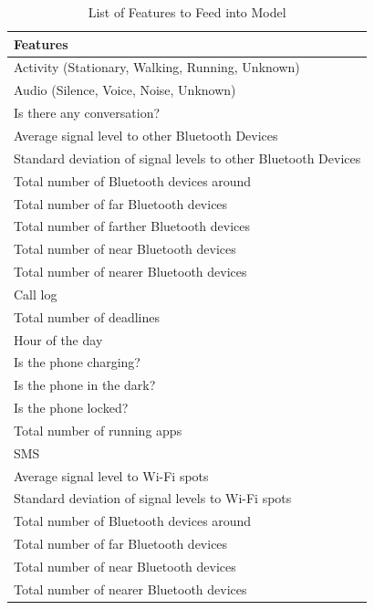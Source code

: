 \documentclass[12pt,oneandhalf,chaparabic,lfm,phd,eng,oneside,pntc]{gsufbe}
\begin{document}
\begin{table}[b!]
\centering
\caption{List of Features to Feed into Model}
\label{tab:features}
\begin{tabular}{|l|}
\hline
Features                                                       \\ \hline
Activity (Stationary, Walking, Running, Unknown)               \\
Audio (Silence, Voice, Noise, Unknown)                         \\
Is there any conversation?                                     \\
Average signal level to other Bluetooth Devices                \\
Standard deviation of signal levels to other Bluetooth Devices \\
Total number of Bluetooth devices around                       \\
Total number of far Bluetooth devices                          \\
Total number of farther Bluetooth devices                      \\
Total number of near Bluetooth devices                         \\
Total number of nearer Bluetooth devices                       \\
Call log                                                       \\
Total number of deadlines                                      \\
Hour of the day                                                \\
Is the phone charging?                                         \\
Is the phone in the dark?                                      \\
Is the phone locked?                                           \\
Total number of running apps                                   \\
SMS                                                            \\
Average signal level to Wi-Fi spots                            \\
Standard deviation of signal levels to Wi-Fi spots             \\
Total number of Bluetooth devices around                       \\
Total number of far Bluetooth devices                          \\
Total number of near Bluetooth devices                         \\
Total number of nearer Bluetooth devices                       \\ \hline
\end{tabular}
\end{table}
\end{document}

